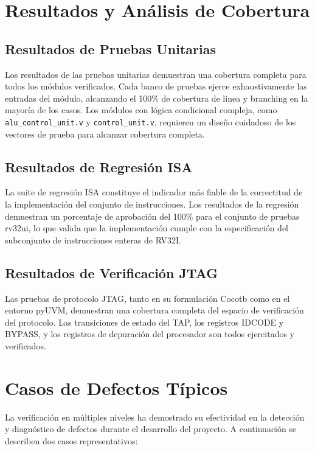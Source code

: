 \section{Resultados y Análisis de Cobertura}
\label{sec:Results}

\subsection{Resultados de Pruebas Unitarias}

Los resultados de las pruebas unitarias demuestran una cobertura completa para todos los módulos verificados. Cada banco de pruebas ejerce exhaustivamente las entradas del módulo, alcanzando el 100\% de cobertura de línea y branching en la mayoría de los casos. Los módulos con lógica condicional compleja, como \texttt{alu\_control\_unit.v} y \texttt{control\_unit.v}, requieren un diseño cuidadoso de los vectores de prueba para alcanzar cobertura completa.

\subsection{Resultados de Regresión ISA}

La suite de regresión ISA constituye el indicador más fiable de la correctitud de la implementación del conjunto de instrucciones. Los resultados de la regresión demuestran un porcentaje de aprobación del 100\% para el conjunto de pruebas rv32ui, lo que valida que la implementación cumple con la especificación del subconjunto de instrucciones enteras de RV32I.

\subsection{Resultados de Verificación JTAG}

Las pruebas de protocolo JTAG, tanto en su formulación Cocotb como en el entorno pyUVM, demuestran una cobertura completa del espacio de verificación del protocolo. Las transiciones de estado del TAP, los registros IDCODE y BYPASS, y los registros de depuración del procesador son todos ejercitados y verificados.

\section{Casos de Defectos Típicos}
\label{sec:DefectCases}

La verificación en múltiples niveles ha demostrado su efectividad en la detección y diagnóstico de defectos durante el desarrollo del proyecto. A continuación se describen dos casos representativos:


